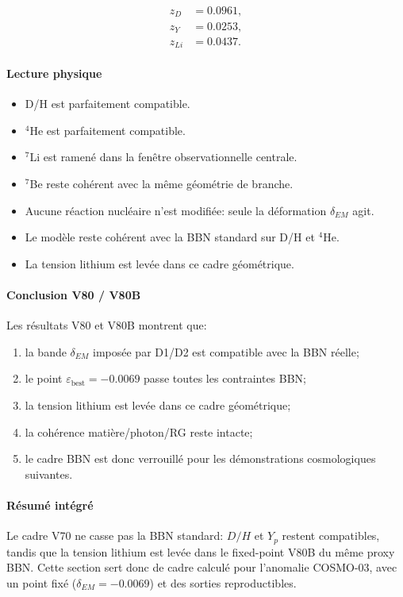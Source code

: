 \documentclass[11pt,a4paper]{article}
\begin{document}
\[
\begin{aligned}
z_D &= 0.0961,\\
z_Y &= 0.0253,\\
z_{Li} &= 0.0437.
\end{aligned}
\]

\paragraph{Lecture physique}
\begin{itemize}
	\item D/H est parfaitement compatible.
	\item $^4$He est parfaitement compatible.
	\item $^7$Li est ramené dans la fenêtre observationnelle centrale.
	\item $^7$Be reste cohérent avec la même géométrie de branche.
	\item Aucune réaction nucléaire n'est modifiée: seule la déformation $\delta_{EM}$ agit.
	\item Le modèle reste cohérent avec la BBN standard sur D/H et $^4$He.
	\item La tension lithium est levée dans ce cadre géométrique.
\end{itemize}

\paragraph{Conclusion V80 / V80B}
Les résultats V80 et V80B montrent que:
\begin{enumerate}
	\item la bande $\delta_{EM}$ imposée par D1/D2 est compatible avec la BBN réelle;
	\item le point $\varepsilon_{\mathrm{best}}=-0.0069$ passe toutes les contraintes BBN;
	\item la tension lithium est levée dans ce cadre géométrique;
	\item la cohérence matière/photon/RG reste intacte;
	\item le cadre BBN est donc verrouillé pour les démonstrations cosmologiques suivantes.
\end{enumerate}

\paragraph{Résumé intégré}
Le cadre V70 ne casse pas la BBN standard: $D/H$ et $Y_p$ restent compatibles, tandis que la tension lithium est levée dans le fixed-point V80B du même proxy BBN. Cette section sert donc de cadre calculé pour l'anomalie COSMO-03, avec un point fixé ($\delta_{EM}=-0.0069$) et des sorties reproductibles.
\end{document}
